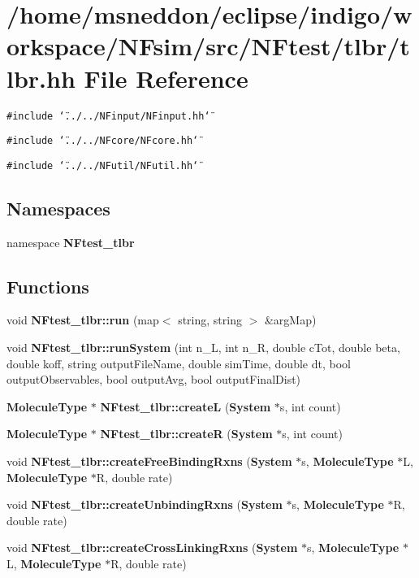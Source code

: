 \section{/home/msneddon/eclipse/indigo/workspace/NFsim/src/NFtest/tlbr/tlbr.hh File Reference}
\label{tlbr_8hh}


{\tt \#include \char`\"{}../../NFinput/NFinput.hh\char`\"{}}\par
{\tt \#include \char`\"{}../../NFcore/NFcore.hh\char`\"{}}\par
{\tt \#include \char`\"{}../../NFutil/NFutil.hh\char`\"{}}\par
\subsection*{Namespaces}
\begin{CompactItemize}
\item 
namespace {\bf NFtest\_\-tlbr}
\end{CompactItemize}
\subsection*{Functions}
\begin{CompactItemize}
\item 
void {\bf NFtest\_\-tlbr::run} (map$<$ string, string $>$ \&argMap)
\item 
void {\bf NFtest\_\-tlbr::runSystem} (int n\_\-L, int n\_\-R, double cTot, double beta, double koff, string outputFileName, double simTime, double dt, bool outputObservables, bool outputAvg, bool outputFinalDist)
\item 
{\bf MoleculeType} $\ast$ {\bf NFtest\_\-tlbr::createL} ({\bf System} $\ast$s, int count)
\item 
{\bf MoleculeType} $\ast$ {\bf NFtest\_\-tlbr::createR} ({\bf System} $\ast$s, int count)
\item 
void {\bf NFtest\_\-tlbr::createFreeBindingRxns} ({\bf System} $\ast$s, {\bf MoleculeType} $\ast$L, {\bf MoleculeType} $\ast$R, double rate)
\item 
void {\bf NFtest\_\-tlbr::createUnbindingRxns} ({\bf System} $\ast$s, {\bf MoleculeType} $\ast$R, double rate)
\item 
void {\bf NFtest\_\-tlbr::createCrossLinkingRxns} ({\bf System} $\ast$s, {\bf MoleculeType} $\ast$L, {\bf MoleculeType} $\ast$R, double rate)
\end{CompactItemize}
